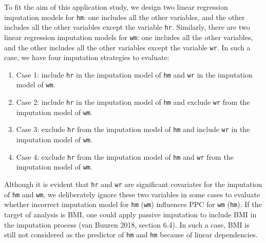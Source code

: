 \documentclass[12pt, fullpage, a4paper]{article}
\begin{document}
To fit the aim of this application study, we design two linear regression imputation models for \texttt{hm}: one includes all the other variables, and the other includes all the other variables except the variable \texttt{hr}. Similarly, there are two linear regression imputation models for \texttt{wm}: one includes all the other variables, and the other includes all the other variables except the variable \texttt{wr}. In such a case, we have four imputation strategies to evaluate:
\begin{enumerate}
	\item Case 1: include \texttt{hr} in the imputation model of \texttt{hm} and \texttt{wr} in the imputation model of \texttt{wm}.
	\item Case 2: include \texttt{hr} in the imputation model of \texttt{hm} and exclude \texttt{wr} from the imputation model of \texttt{wm}.
	\item Case 3: exclude \texttt{hr} from the imputation model of \texttt{hm} and include \texttt{wr} in the imputation model of \texttt{wm}.
	\item Case 4: exclude \texttt{hr} from the imputation model of \texttt{hm} and \texttt{wr} from the imputation model of \texttt{wm}.
\end{enumerate}
Although it is evident that \texttt{hr} and \texttt{wr} are significant covariates for the imputation of \texttt{hm} and \texttt{wm}, we deliberately ignore these two variables in some cases to evaluate whether incorrect imputation model for \texttt{hm} (\texttt{wm}) influences PPC for \texttt{wm} (\texttt{hm}). If the target of analysis is BMI, one could apply passive imputation to include BMI in the imputation process (van Buuren 2018, section 6.4). In such a case, BMI is still not considered as the predictor of \texttt{hm} and \texttt{hm} because of linear dependencies.  
\end{document}
